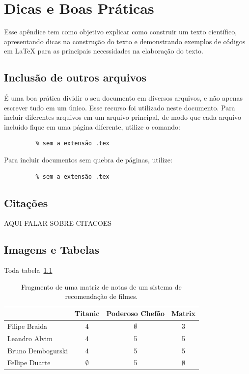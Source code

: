 \chapter{Dicas e Boas Práticas} \label{chp:ap_dicas}

Esse apêndice tem como objetivo explicar como construir um texto científico, apresentando dicas na construção do texto e demonstrando exemplos de códigos em LaTeX para as principais necessidades na elaboração do texto.

\section{Inclusão de outros arquivos}

É uma boa prática dividir o seu documento em diversos arquivos, 
e não
apenas escrever tudo em um único. 
Esse recurso foi utilizado neste documento. 
Para incluir diferentes arquivos em um arquivo principal, 
de modo que cada arquivo incluído fique em uma página diferente, utilize o comando:

\begin{verbatim}
         % sem a extensão .tex
\end{verbatim}

Para incluir documentos sem quebra de páginas, utilize:

\begin{verbatim}
         % sem a extensão .tex
\end{verbatim}

\section{Citações}

AQUI FALAR SOBRE CITACOES

\section{Imagens e Tabelas}\label{sec:LABEL_CHP_2_SEC_A}

Toda tabela~\ref{tab:MATRIX_NOTAS_EXEMPLO}

\begin{table}[!htb]
  \centering
  \caption{Fragmento de uma matriz de notas de um sistema de recomendação de filmes.}
  \label{tab:MATRIX_NOTAS_EXEMPLO}
  \begin{tabular}{l c c c}
  \toprule
    & Titanic & Poderoso Chefão & Matrix \\
    \midrule
        Filipe Braida & 4 & $\emptyset$ & 3  \\
        Leandro Alvim & 4 & 5 & 5  \\
        Bruno Dembogurski & 4 & 5 & 5  \\
        Fellipe Duarte & $\emptyset$ & 5 & $\emptyset$  \\ 
    \bottomrule
  \end{tabular}
\end{table}

